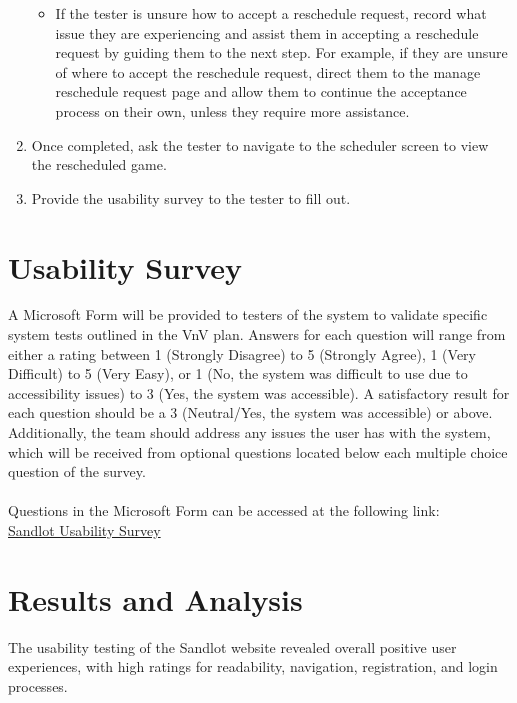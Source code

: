 \documentclass{article}
\begin{document}
\begin{enumerate}
\begin{itemize}
            \item If the tester is unsure how to accept a reschedule request, record what
            issue they are experiencing and assist them in accepting a reschedule request
            by guiding them to the next step. For example, if they are unsure of where
            to accept the reschedule request, direct them to the manage reschedule request page
            and allow them to continue the acceptance process on their own, unless they require more
            assistance.
        \end{itemize}
        \item Once completed, ask the tester to navigate to the scheduler screen to
        view the rescheduled game.
        \item Provide the usability survey to the tester to fill out.
    \end{enumerate}

\section{Usability Survey}
    A Microsoft Form will be provided to testers of the system to validate specific
    system tests outlined in the VnV plan. Answers for each question will range from either a
    rating between 1 (Strongly Disagree) to 5 (Strongly Agree), 1 (Very Difficult) to 5 (Very Easy), or
    1 (No, the system was difficult to use due to accessibility issues) to 3 (Yes, the system was accessible).
    A satisfactory result for each question should be a 3 (Neutral/Yes, the system was accessible) or above.
    Additionally, the team should address any issues the user has with the system, which will be received
    from optional questions located below each multiple choice question of the survey.
    \\\\Questions in the Microsoft Form can be accessed at the following link:\\

    \href{https://forms.office.com/Pages/ResponsePage.aspx?id=B2M3RCm0rUKMJSjNSW9HcodvkeIlB8lOjrmyIWuVT7dUQ0hBNFRVTjFHWVhITDIzSklZRDRYTVZRMi4u}{Sandlot Usability Survey}

\section{Results and Analysis}
    The usability testing of the Sandlot website revealed overall positive user
    experiences, with high ratings for readability, navigation, registration,
    and login processes.
    
\end{document}
